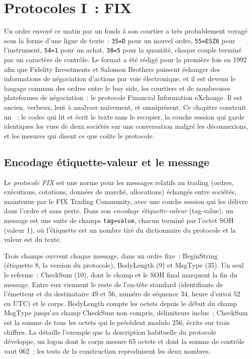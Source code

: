 \chapter{Protocoles I~: FIX}\label{ch:ll:protocols-i-fix}

Un ordre envoyé ce matin par un fonds à son courtier a très probablement voyagé sous la forme d'une ligne de texte~: \texttt{35=D} pour un nouvel
ordre, \texttt{55=ESZ6} pour l'instrument, \texttt{54=1} pour un achat, \texttt{38=5} pour la quantité, chaque couple terminé par un
caractère de contrôle. Le format a été rédigé pour la première fois en 1992 afin que Fidelity Investments et Salomon Brothers puissent échanger
des informations de négociation d'actions par voie électronique, et il est devenu le langage commun des ordres entre le buy side, les courtiers et
de nombreuses plateformes de négociation~: le protocole Financial Information eXchange. Il est ancien, verbeux, lent à analyser naïvement, et omniprésent. Ce
chapitre construit un ~: le codec qui lit et écrit le texte sans le recopier, la couche session qui garde
identiques les vues de deux sociétés sur une conversation malgré les déconnexions, et les mesures qui disent ce que coûte le protocole.

\section{Encodage étiquette-valeur et le message}

\begin{definition}\label{def:ll:protocols-i-fix:fix}
Le \emph{protocole FIX} est une norme pour les messages relatifs au trading (ordres, exécutions, cotations, données
de marché, allocations) échangés entre sociétés, maintenue par le FIX Trading Community, avec une couche session qui les délivre dans l'ordre
et sans perte. Dans son \emph{encodage étiquette-valeur} (tag-value), un message est une suite de champs
\texttt{tag=value}, chacun terminé par l'octet SOH (valeur 1), où l'étiquette est un nombre tiré du dictionnaire du protocole et la
valeur est du texte.
\end{definition}

Trois champs ouvrent chaque message, dans un ordre fixe~: BeginString (étiquette 8, la version du protocole), BodyLength (9) et MsgType (35).
Un seul le referme~: CheckSum (10), dont le champ et le SOH final marquent la fin du message. Entre eux viennent le reste
de l'en-tête standard (identifiants de l'émetteur et du destinataire 49 et 56, numéro de séquence 34, heure d'envoi 52 en UTC) et le
corps. BodyLength compte les octets depuis le début du champ MsgType jusqu'au champ CheckSum non compris, délimiteurs
inclus~; CheckSum est la somme de tous les octets qui le précèdent modulo 256, écrite sur trois chiffres.
La  détaille l'exemple que la description habituelle du protocole développe, un logon
dont le corps mesure 65 octets et dont la somme de contrôle vaut 062~; les tests de la construction reproduisent les deux nombres.

